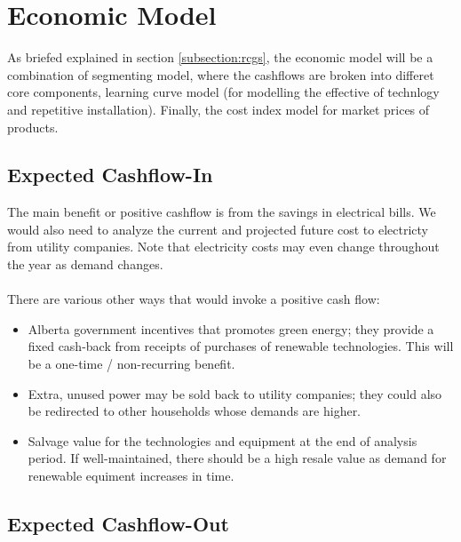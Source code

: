 \documentclass[10pt,letterpaper]{article}
\begin{document}
\section{Economic Model}
As briefed explained in section \ref{subsection:rcgs}, the economic model will be a combination of segmenting model, where the cashflows are broken into differet core components, learning curve model (for modelling the effective of technlogy and repetitive installation). Finally, the cost index model for market prices of products.\\

\subsection{Expected Cashflow-In}
The main benefit or positive cashflow is from the savings in electrical bills. We would also need to analyze the current and projected future cost to electricty from utility companies. Note that electricity costs may even change throughout the year as demand changes.\\
\\
There are various other ways that would invoke a positive cash flow:\\

\begin{itemize}
	\item Alberta government incentives that promotes green energy; they provide a fixed cash-back from receipts of purchases of renewable technologies. This will be a one-time / non-recurring benefit.

	\item Extra, unused power may be sold back to utility companies; they could also be redirected to other households whose demands are higher.

	\item Salvage value for the technologies and equipment at the end of analysis period. If well-maintained, there should be a high resale value as demand for renewable equiment increases in time.
\end{itemize}

\subsection{Expected Cashflow-Out}\label{subsection:cashflow-out}
\end{document}
